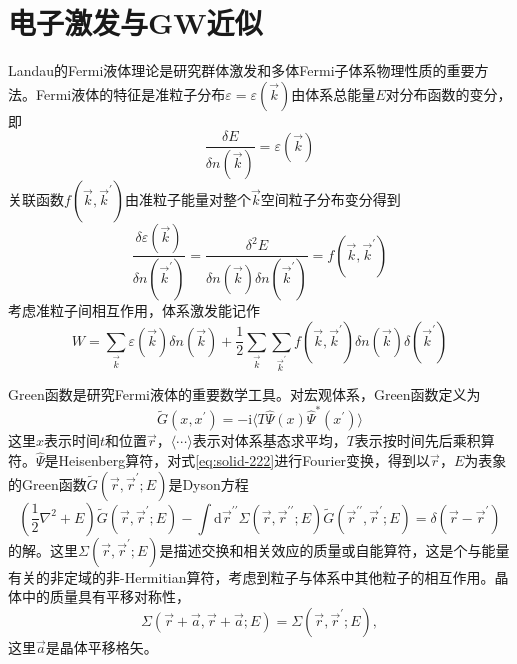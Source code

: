 \section{电子激发与GW近似}
Landau的Fermi液体理论是研究群体激发和多体Fermi子体系物理性质的重要方法\cite{Landau}。Fermi液体的特征是准粒子分布$\varepsilon=\varepsilon(\vec k)$由体系总能量$E$对分布函数的变分，即
\begin{equation}
  \frac{\delta E}{\delta n(\vec k)}=\varepsilon(\vec k)
  \label{eq:solid-219}
\end{equation}
关联函数$f(\vec k,\vec k^{\prime})$由准粒子能量对整个$\vec k$空间粒子分布变分得到
\begin{equation}
  \frac{\delta\varepsilon(\vec k)}{\delta n(\vec k^{\prime})}=\frac{\delta^2E}{\delta n(\vec k)\delta n(\vec k^{\prime})}=f(\vec k,\vec k^{\prime})
  \label{eq:solid-220}
\end{equation}
考虑准粒子间相互作用，体系激发能记作
\begin{equation}
  W=\sum_{\vec k}\varepsilon(\vec k)\delta n(\vec k)+\frac12\sum_{\vec k}\sum_{\vec k^{\prime}}f(\vec k,\vec k^{\prime})\delta n(\vec k)\delta(\vec k^{\prime})
  \label{eq:solid-221}
\end{equation}

Green函数是研究Fermi液体的重要数学工具。对宏观体系，Green函数定义为\cite{Lifshitz}
\begin{equation}
	\tilde G(x,x^{\prime})=-\mathrm{i}\langle T\hat\Psi(x)\hat\Psi^{\ast}(x^{\prime})\rangle
  \label{eq:solid-222}
\end{equation}
这里$x$表示时间$t$和位置$\vec r$，$\langle\cdots\rangle$表示对体系基态求平均，$T$表示按时间先后乘积算符。$\hat\Psi$是Heisenberg算符，对式\eqref{eq:solid-222}进行Fourier变换，得到以$\vec r$，$E$为表象的Green函数$\tilde G(\vec r,\vec r^{\prime};E)$是Dyson方程\cite{Lifshitz}
\begin{equation}
	(\dfrac12\nabla^2+E)\tilde G(\vec r,\vec r^{\prime};E)-\int\mathrm{d}\vec r^{\prime\prime}\Sigma(\vec r,\vec r^{\prime\prime};E)\tilde G(\vec r^{\prime\prime},\vec r^{\prime};E)=\delta(\vec r-\vec r^{\prime})
  \label{eq:solid-223}
\end{equation}
的解。这里$\Sigma(\vec r,\vec r^{\prime};E)$是描述交换和相关效应的质量或自能算符，这是个与能量有关的非定域的非-Hermitian算符，考虑到粒子与体系中其他粒子的相互作用。晶体中的质量具有平移对称性，
\begin{equation}
  \Sigma(\vec r+\vec a,\vec r+\vec a;E)=\Sigma(\vec r,\vec r^{\prime};E),
  \label{eq:solid:224}
\end{equation}
这里$\vec a$是晶体平移格矢。


